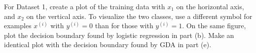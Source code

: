 \clearpage
\item {}
For Dataset 1, create a plot of the training data with $x_1$ on the horizontal
axis, and $x_2$ on the vertical axis. To visualize the two classes, use a
different symbol for examples $x^{(i)}$ with $y^{(i)} = 0$ than for those with
$y^{(i)} = 1$. On the same figure, plot the decision boundary found by logistic
regression in part (b). Make an identical plot with the decision boundary found
by GDA in part (e).

\ifnum{} {

} \fi
